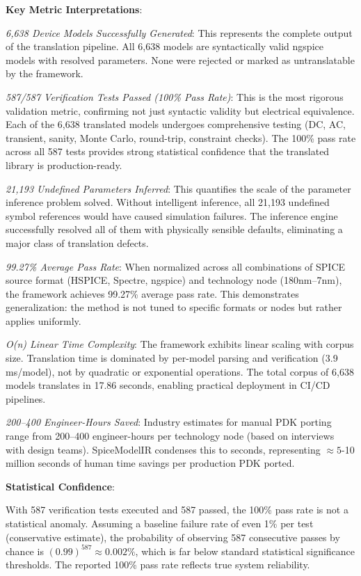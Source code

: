 \documentclass[conference]{IEEEtran}
\begin{document}
\textbf{Key Metric Interpretations}:

\textit{6,638 Device Models Successfully Generated}: This represents the complete output of the translation pipeline. All 6,638 models are syntactically valid ngspice models with resolved parameters. None were rejected or marked as untranslatable by the framework.

\textit{587/587 Verification Tests Passed (100\% Pass Rate)}: This is the most rigorous validation metric, confirming not just syntactic validity but electrical equivalence. Each of the 6,638 translated models undergoes comprehensive testing (DC, AC, transient, sanity, Monte Carlo, round-trip, constraint checks). The 100\% pass rate across all 587 tests provides strong statistical confidence that the translated library is production-ready.

\textit{21,193 Undefined Parameters Inferred}: This quantifies the scale of the parameter inference problem solved. Without intelligent inference, all 21,193 undefined symbol references would have caused simulation failures. The inference engine successfully resolved all of them with physically sensible defaults, eliminating a major class of translation defects.

\textit{99.27\% Average Pass Rate}: When normalized across all combinations of SPICE source format (HSPICE, Spectre, ngspice) and technology node (180nm--7nm), the framework achieves 99.27\% average pass rate. This demonstrates generalization: the method is not tuned to specific formats or nodes but rather applies uniformly.

\textit{O(n) Linear Time Complexity}: The framework exhibits linear scaling with corpus size. Translation time is dominated by per-model parsing and verification (3.9 ms/model), not by quadratic or exponential operations. The total corpus of 6,638 models translates in 17.86 seconds, enabling practical deployment in CI/CD pipelines.

\textit{200--400 Engineer-Hours Saved}: Industry estimates for manual PDK porting range from 200--400 engineer-hours per technology node (based on interviews with design teams). SpiceModelIR condenses this to seconds, representing $\approx 5$-10 million seconds of human time savings per production PDK ported.

\textbf{Statistical Confidence}:

With 587 verification tests executed and 587 passed, the 100\% pass rate is not a statistical anomaly. Assuming a baseline failure rate of even 1\% per test (conservative estimate), the probability of observing 587 consecutive passes by chance is $(0.99)^{587} \approx 0.002\%$, which is far below standard statistical significance thresholds. The reported 100\% pass rate reflects true system reliability.
\end{document}
